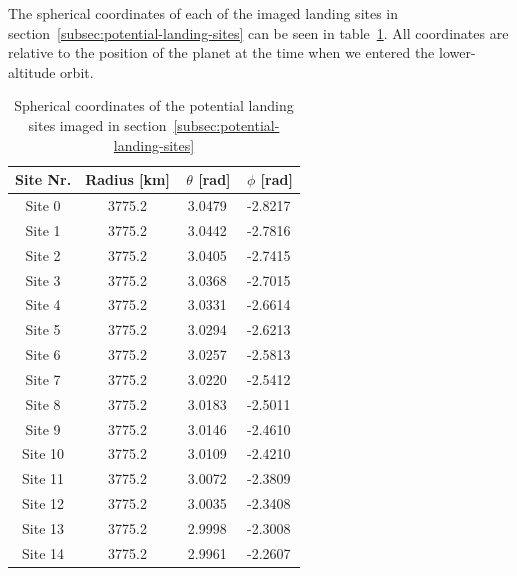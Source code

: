 \documentclass[reprint,english,notitlepage]{revtex4-2}
\begin{document}
    The spherical coordinates of each of the imaged landing sites in section~\ref{subsec:potential-landing-sites} can be seen in table~\ref{tab:land_coords}.
    All coordinates are relative to the position of the planet at the time when we entered the lower-altitude orbit.\\
    \begin{table}[h]
        \begin{tabular}{|c|c|c|c|}
            \hline
            Site Nr. & Radius [km] & $\,\theta$ [rad] & $\,\phi$ [rad]\\
            \hline
            Site 0 & 3775.2 & 3.0479 & -2.8217\\
            \hline
            Site 1 & 3775.2 & 3.0442 & -2.7816\\
            \hline
            Site 2 & 3775.2 & 3.0405 & -2.7415\\
            \hline
            Site 3 & 3775.2 & 3.0368 & -2.7015\\
            \hline
            Site 4 & 3775.2 & 3.0331 & -2.6614\\
            \hline
            Site 5 & 3775.2 & 3.0294 & -2.6213\\
            \hline
            Site 6 & 3775.2 & 3.0257 & -2.5813\\
            \hline
            Site 7 & 3775.2 & 3.0220 & -2.5412\\
            \hline
            Site 8 & 3775.2 & 3.0183 & -2.5011\\
            \hline
            Site 9 & 3775.2 & 3.0146 & -2.4610\\
            \hline
            Site 10 & 3775.2 & 3.0109 & -2.4210\\
            \hline
            Site 11 & 3775.2 & 3.0072 & -2.3809\\
            \hline
            Site 12 & 3775.2 & 3.0035 & -2.3408\\
            \hline
            Site 13 & 3775.2 & 2.9998 & -2.3008\\
            \hline
            Site 14 & 3775.2 & 2.9961 & -2.2607\\
            \hline
        \end{tabular}
        \caption{Spherical coordinates of the potential landing sites imaged in section~\ref{subsec:potential-landing-sites}}
        \label{tab:land_coords}
    \end{table}
\end{document}
